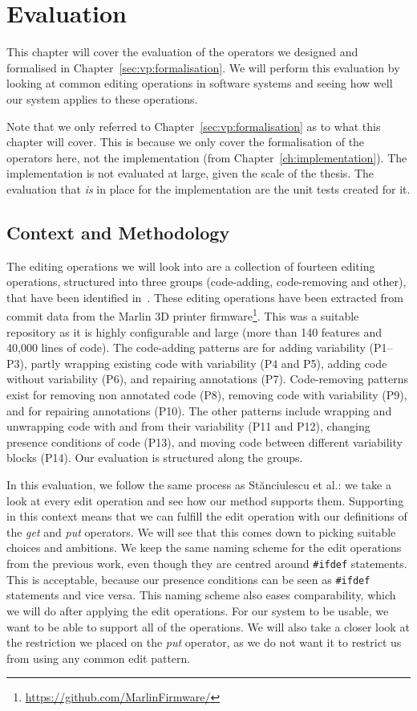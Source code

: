 \chapter{Evaluation}\label{sec:evaluation}
This chapter will cover the evaluation of the operators we designed and
formalised in Chapter~\ref{sec:vp:formalisation}. We will perform this
evaluation by looking at common editing operations in software systems and
seeing how well our system applies to these operations.

Note that we only referred to Chapter~\ref{sec:vp:formalisation} as to what this
chapter will cover. This is because we only cover the formalisation of the operators
here, not the implementation (from Chapter~\ref{ch:implementation}). The implementation
is not evaluated at large, given the scale of the thesis. The evaluation that \emph{is}
in place for the implementation are the unit tests created for it.

\section{Context and Methodology}
The editing operations we will look into are a collection of fourteen editing
operations, structured into three groups (code-adding, code-removing and other), 
that have been identified in~\cite{stuanciulescu2016}. These editing operations
have been extracted from commit data from the Marlin 3D printer firmware\footnote{\url{https://github.com/MarlinFirmware/}}.
This was a suitable repository as it is highly configurable and large (more than 140
features and 40,000 lines of code). The code-adding patterns are for adding variability (P1--P3),
partly wrapping existing code with variability (P4 and P5), adding code without variability (P6), and
repairing annotations (P7). Code-removing patterns exist for removing non annotated code (P8),
removing code with variability (P9), and for repairing annotations (P10). The other patterns 
include wrapping and unwrapping code with and from their variability (P11 and P12), changing
presence conditions of code (P13), and moving code between different variability blocks (P14).
Our evaluation is structured along the groups.

In this evaluation, we follow the same process as St{\u{a}}nciulescu et al.: we
take a look at every edit operation and see how our method supports them. Supporting in this
context means that we can fulfill the edit operation with our definitions of the \emph{get}
and \emph{put} operators. We will see that this comes down to picking suitable choices
and ambitions.
We keep the same naming scheme for the edit operations from the previous work, even
though they are centred around \texttt{\#ifdef} statements. This is acceptable, because
our presence conditions can be seen as \texttt{\#ifdef} statements and vice versa. This naming
scheme also eases comparability, which we will do after applying the edit operations.
For our system to be usable, we
want to be able to support all of the operations. We will also take a closer look 
at the restriction we placed on the \emph{put} operator, as we do not want it to
restrict us from using any common edit pattern. 

